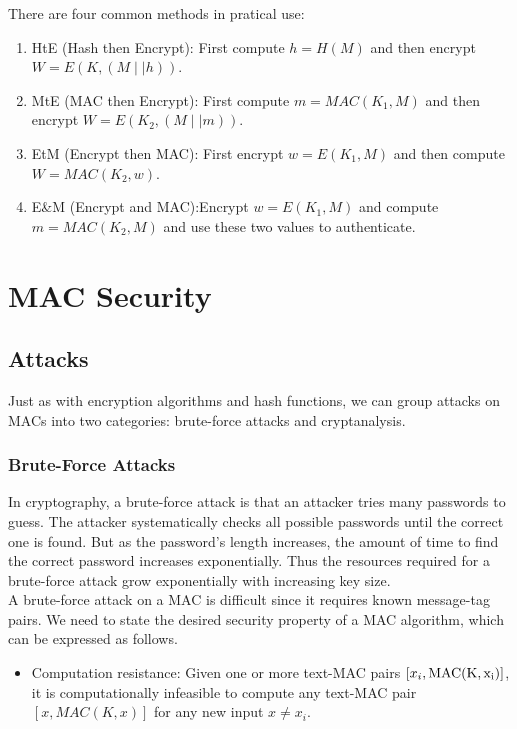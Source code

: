 \documentclass[12pt,a4paper,oneside]{report}
\begin{document}
There are four common methods in pratical use:
\begin{enumerate}[(1)]
    \item HtE (Hash then Encrypt): First compute $h=H(M)$ and then encrypt $W=E(K,(M\mid\mid h))$.
    \item MtE (MAC then Encrypt): First compute $m=MAC(K_1,M)$ and then encrypt $W=E(K_2,(M\mid\mid m))$.
    \item EtM (Encrypt then MAC): First encrypt $w=E(K_1,M)$ and then compute $W=MAC(K_2,w)$.
    \item E\&M (Encrypt and MAC):Encrypt $w=E(K_1,M)$ and compute $m=MAC(K_2,M)$ and use these two values to authenticate.
\end{enumerate}










\chapter{  MAC Security}
\section{Attacks}
Just as with encryption algorithms and hash functions, we can group attacks on
MACs into two categories: brute-force attacks and cryptanalysis.\\

\subsection{Brute-Force Attacks}
In cryptography, a brute-force attack is that an attacker tries many passwords to guess. The attacker systematically checks all possible passwords until the correct one is found. But as the password’s length increases, the amount of time to find the correct password increases exponentially. Thus the resources required for a brute-force attack grow exponentially with increasing key size.\\

A brute-force attack on a MAC is difficult since it requires known message-tag pairs. We need to state the desired security property of a MAC algorithm, which can be expressed as follows.
\begin{itemize}
    \item Computation resistance: Given one or more text-MAC pairs $[x_i,\rm{MAC}(K,x_i)]$,
it is computationally infeasible to compute any text-MAC pair $[x, MAC(K, x)]$ for any new input $x \neq x_i$.
\end{itemize}
\end{document}

